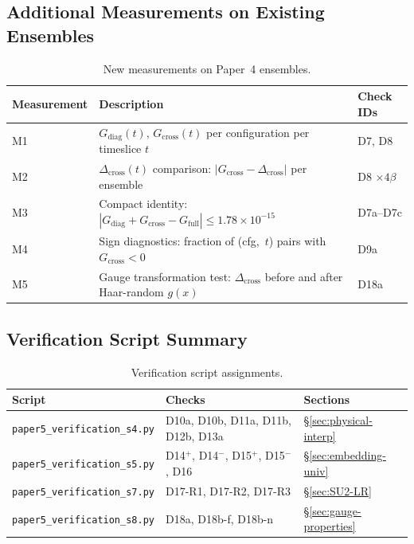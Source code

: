 \documentclass[12pt]{article}
\numberwithin{equation}{section}
\theoremstyle{plain}
\theoremstyle{definition}
\theoremstyle{remark}
\newcommand{\Gdiag}{G_{\mathrm{diag}}}     %
\newcommand{\Gcross}{G_{\mathrm{cross}}}   %
\newcommand{\Gfull}{G_{\mathrm{full}}}     %
\newcommand{\Dcross}{\Delta_{\mathrm{cross}}}  %
\begin{document}
		\subsection{Additional Measurements on Existing Ensembles}
		\label{sec:new-measurements}
		
		\begin{table}[ht]
			\centering
			\caption{New measurements on Paper~4 ensembles.}
			\label{tab:new-measurements}
			\small
			\setlength{\tabcolsep}{8pt}
			\begin{tabular}{@{}lp{8cm}l@{}}
				\toprule
				\textbf{Measurement} & \textbf{Description}
				& \textbf{Check IDs}\\
				\midrule
				M1 & $\Gdiag(t),\,\Gcross(t)$ per configuration per
				timeslice $t$
				& D7, D8\\
				M2 & $\Dcross(t)$ comparison:
				$|\Gcross - \Dcross|$ per ensemble
				& D8 $\times 4\beta$\\
				M3 & Compact identity:
				$|\Gdiag + \Gcross - \Gfull|
				\leq 1.78\times 10^{-15}$
				& D7a--D7c\\
				M4 & Sign diagnostics: fraction of (cfg,~$t$) pairs
				with $\Gcross < 0$
				& D9a\\
				M5 & Gauge transformation test: $\Dcross$ before and
				after Haar-random $g(x)$
				& D18a\\
				\bottomrule
			\end{tabular}
		\end{table}
		
		\subsection{Verification Script Summary}
		\label{sec:scripts}
		
		\begin{table}[ht]
			\centering
			\caption{Verification script assignments.}
			\label{tab:verification-scripts}
			\small
			\setlength{\tabcolsep}{8pt}
			\begin{tabular}{@{}lll@{}}
				\toprule
				\textbf{Script} & \textbf{Checks} & \textbf{Sections}\\
				\midrule
				\texttt{paper5\_verification\_s4.py}
				& D10a, D10b, D11a, D11b, D12b, D13a
				& \S\ref{sec:physical-interp}\\
				\texttt{paper5\_verification\_s5.py}
				& D14$^{+}$, D14$^{-}$, D15$^{+}$, D15$^{-}$, D16
				& \S\ref{sec:embedding-univ}\\
				\texttt{paper5\_verification\_s7.py}
				& D17-R1, D17-R2, D17-R3
				& \S\ref{sec:SU2-LR}\\
				\texttt{paper5\_verification\_s8.py}
				& D18a, D18b-f, D18b-n
				& \S\ref{sec:gauge-properties}\\
				\bottomrule
			\end{tabular}
		\end{table}
		
\end{document}

